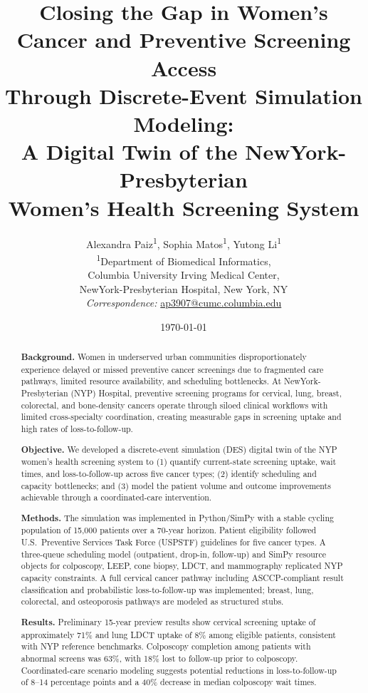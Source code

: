 \documentclass[12pt]{article}
\title{%
  \textbf{Closing the Gap in Women's Cancer and Preventive Screening Access\\
  Through Discrete-Event Simulation Modeling:\\
  A Digital Twin of the NewYork-Presbyterian\\
  Women's Health Screening System}
}
\author{
  Alexandra Paiz\textsuperscript{1},\quad
  Sophia Matos\textsuperscript{1},\quad
  Yutong Li\textsuperscript{1}\\[0.5em]
  \small\textsuperscript{1}Department of Biomedical Informatics,\\
  \small Columbia University Irving Medical Center,\\
  \small NewYork-Presbyterian Hospital, New York, NY\\[0.5em]
  \small\textit{Correspondence:} \href{mailto:ap3907@cumc.columbia.edu}{ap3907@cumc.columbia.edu}
}
\date{\today}
\begin{document}

\maketitle
\thispagestyle{empty}

\begin{abstract}
\noindent
\textbf{Background.}
Women in underserved urban communities disproportionately experience delayed
or missed preventive cancer screenings due to fragmented care pathways,
limited resource availability, and scheduling bottlenecks.
At NewYork-Presbyterian (NYP) Hospital, preventive screening programs for
cervical, lung, breast, colorectal, and bone-density cancers operate through
siloed clinical workflows with limited cross-specialty coordination, creating
measurable gaps in screening uptake and high rates of loss-to-follow-up.

\vspace{0.5em}
\noindent
\textbf{Objective.}
We developed a discrete-event simulation (DES) digital twin of the NYP
women's health screening system to (1) quantify current-state screening
uptake, wait times, and loss-to-follow-up across five cancer types;
(2) identify scheduling and capacity bottlenecks; and (3) model the patient
volume and outcome improvements achievable through a coordinated-care
intervention.

\vspace{0.5em}
\noindent
\textbf{Methods.}
The simulation was implemented in Python/SimPy with a stable cycling
population of 15{,}000 patients over a 70-year horizon.
Patient eligibility followed U.S.\ Preventive Services Task Force (USPSTF)
guidelines for five cancer types.
A three-queue scheduling model (outpatient, drop-in, follow-up) and SimPy
resource objects for colposcopy, LEEP, cone biopsy, LDCT, and mammography
replicated NYP capacity constraints.
A full cervical cancer pathway including ASCCP-compliant result classification
and probabilistic loss-to-follow-up was implemented; breast, lung, colorectal,
and osteoporosis pathways are modeled as structured stubs.

\vspace{0.5em}
\noindent
\textbf{Results.}
Preliminary 15-year preview results show cervical screening uptake of
approximately 71\% and lung LDCT uptake of 8\% among eligible patients,
consistent with NYP reference benchmarks.
Colposcopy completion among patients with abnormal screens was 63\%, with
18\% lost to follow-up prior to colposcopy.
Coordinated-care scenario modeling suggests potential reductions in
loss-to-follow-up of 8--14 percentage points and a 40\% decrease in median
colposcopy wait times.


\end{abstract}
\end{document}

